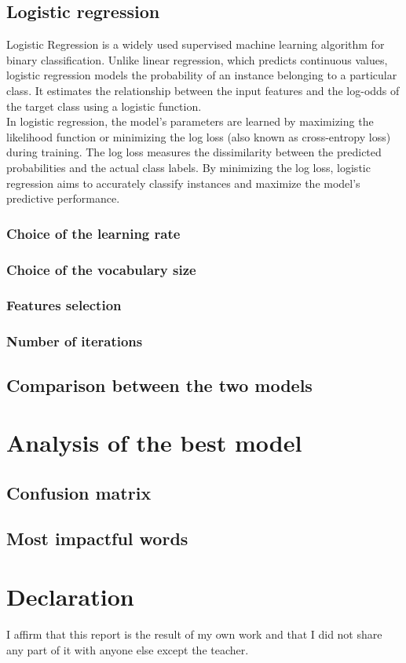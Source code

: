 \documentclass{class}
\begin{document}
\subsection{Logistic regression}
Logistic Regression is a widely used supervised machine learning algorithm for binary classification.
Unlike linear regression, which predicts continuous values, logistic regression models the probability of an instance belonging to a particular class.
It estimates the relationship between the input features and the log-odds of the target class using a logistic function.\\
In logistic regression, the model's parameters are learned by maximizing the likelihood function or minimizing the log loss
(also known as cross-entropy loss) during training.
The log loss measures the dissimilarity between the predicted probabilities and the actual class labels.
By minimizing the log loss, logistic regression aims to accurately classify instances and maximize the model's predictive performance.
\subsubsection*{Choice of the learning rate}
\subsubsection*{Choice of the vocabulary size}
\subsubsection*{Features selection}
\subsubsection*{Number of iterations}
\subsection{Comparison between the two models}
\section{Analysis of the best model}
\subsection{Confusion matrix}
\subsection{Most impactful words}

\pagestyle{OtherPage}

\section{Declaration}
I affirm that this report is the result of my own work and that I did not share any part of it with anyone
else except the teacher.
\end{document}
